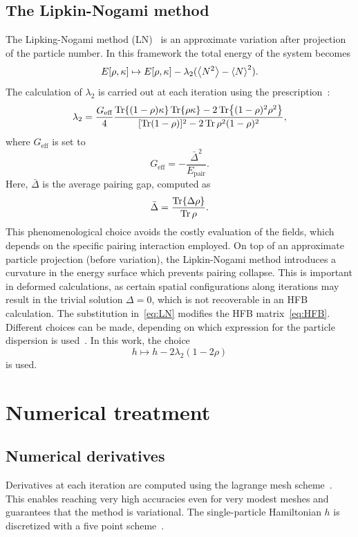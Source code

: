 \documentclass[%
 reprint, linenumbers,
 amsmath,amssymb,
 aps, physrev
]{revtex4-2}
\begin{document}
\subsection{The Lipkin-Nogami method}
The Lipking-Nogami method (LN)~\cite{Lipkin1960} is an approximate variation after projection of the particle number. In this framework the total energy of the system becomes
\begin{equation}
E[\rho, \kappa]\mapsto E[\rho, \kappa] -\lambda_2 (\expval{N^2}-\expval{N}^2).\label{eq:LN}
\end{equation}
The calculation of $\lambda_2$ is carried out at each iteration using the prescription~\cite{Stoitsov2007, Stoitsov2003}:
\begin{equation}
  \lambda_2=\frac{G_\text{eff}}{4}\frac{\Tr{(1-\rho)\kappa}\Tr{\rho\kappa}-2\Tr{(1-\rho)^2 \rho^2}}{[\Tr(1-\rho)]^2-2\Tr\rho^2(1-\rho)^2},
\end{equation}
where $G_\text{eff}$ is set to
\begin{equation}
  G_\text{eff}=-\frac{\bar\Delta^2}{E_\text{pair}}.
\end{equation}
Here, $\bar\Delta$ is the average pairing gap, computed as
\begin{equation}
  \bar\Delta = \frac{\Tr{\Delta\rho}}{\Tr\rho}.
\end{equation}
This phenomenological choice avoids the costly evaluation of the fields, which depends on the specific pairing interaction employed.
On top of an approximate particle projection (before variation), the Lipkin-Nogami method introduces a curvature in the energy surface which prevents pairing collapse. This is important in deformed calculations, as certain spatial configurations along iterations may result in the trivial solution $\Delta = 0$, which is not recoverable in an HFB calculation.
The substitution in~\eqref{eq:LN} modifies the HFB matrix~\eqref{eq:HFB}. Different choices can be made, depending on which expression for the particle dispersion is used~\cite{two_basis_hg_bands}. In this work, the choice 
\begin{equation}
  h\mapsto h-2\lambda_2(1-2\rho)
\end{equation}
is used.
\section{Numerical treatment}
\subsection{Numerical derivatives}
Derivatives at each iteration are computed using the lagrange mesh scheme~\cite{ryssens_precision}. This enables reaching very high accuracies even for very modest meshes and guarantees that the method is variational. The single-particle Hamiltonian $h$ is discretized with a five point scheme~\cite{finite_diff}.
\end{document}
